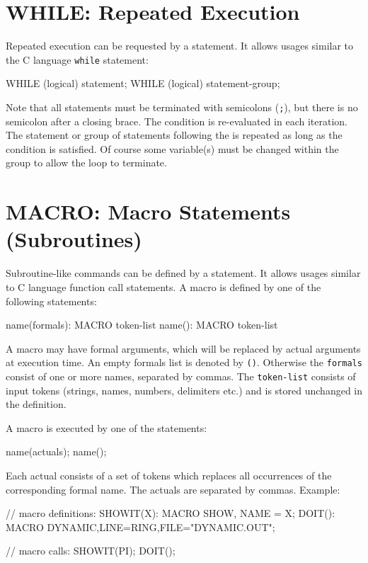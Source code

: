 \section{WHILE: Repeated Execution}
\label{sec:while}
Repeated execution can be requested by a  statement.
It allows usages similar to the C language \texttt{while} statement:
\begin{example}
WHILE (logical) statement;
WHILE (logical) { statement-group; }
\end{example}
Note that all statements must be terminated with semicolons (\texttt{;}),
but there is no semicolon after a closing brace.
The condition is re-evaluated in each iteration.
The statement or group of statements following the  is
repeated as long as the condition is satisfied.
Of course some variable(s) must be changed within the  group
to allow the loop to terminate.

\section{MACRO: Macro Statements (Subroutines)}
\label{sec:macro}
Subroutine-like commands can be defined by a  statement.
It allows usages similar to C language function call statements.
A macro is defined by one of the following statements:
\begin{example}
name(formals): MACRO { token-list }
name(): MACRO { token-list }
\end{example}
A macro may have formal arguments, which will be replaced by actual arguments
at execution time. An empty formals list is denoted by \texttt{()}.
Otherwise the \texttt{formals} consist of one or more names,
separated by commas.
The \texttt{token-list} consists of input tokens
(strings, names, numbers, delimiters etc.)
and is stored unchanged in the definition.

A macro is executed by one of the statements:
\begin{example}
name(actuals);
name();
\end{example}
Each actual consists of a set of tokens which replaces all occurrences of
the corresponding formal name.
The actuals are separated by commas.
\noindent Example:
\begin{example}
// macro definitions:
SHOWIT(X): MACRO {
   SHOW, NAME = X;
}
DOIT(): MACRO {
   DYNAMIC,LINE=RING,FILE="DYNAMIC.OUT";
}

// macro calls:
SHOWIT(PI);
DOIT();
\end{example}



